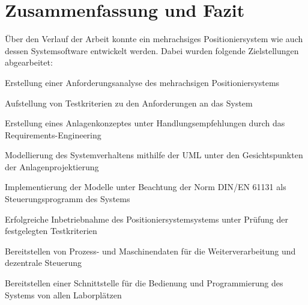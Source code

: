 \documentclass[../../Bachelorarbeit.tex]{subfiles}
\begin{document}
\section{Zusammenfassung und Fazit}
Über den Verlauf der Arbeit konnte ein mehrachsiges Positioniersystem wie auch dessen Systemsoftware entwickelt werden. Dabei wurden folgende Zielstellungen abgearbeitet:

\bigskip
\begin{compactitem}
	\item Erstellung einer Anforderungsanalyse des mehrachsigen Positioniersystems
	\item Aufstellung von Testkriterien zu den Anforderungen an das System
	\item Erstellung eines Anlagenkonzeptes unter Handlungsempfehlungen durch das Requirements-Engineering
	\item Modellierung des Systemverhaltens mithilfe der UML unter den Gesichtspunkten der Anlagenprojektierung
	\item Implementierung der Modelle unter Beachtung der Norm DIN/EN 61131 als Steuerungsprogramm des Systems
	\item Erfolgreiche Inbetriebnahme des Positioniersystemsystems unter Prüfung der festgelegten Testkriterien
	\item Bereitstellen von Prozess- und Maschinendaten für die Weiterverarbeitung und dezentrale Steuerung
	\item Bereitstellen einer Schnittstelle für die Bedienung und Programmierung des Systems von allen Laborplätzen
\end{compactitem}
\bigskip
\end{document}
